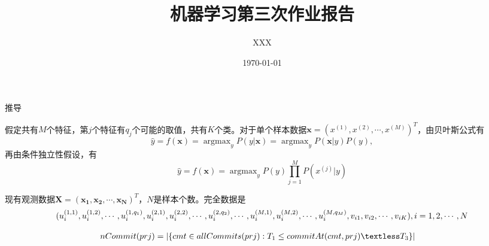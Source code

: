 \documentclass[UTF8]{ctexart}
\title{机器学习第三次作业报告}
\author{XXX}
\date{\today}
\DeclareMathOperator*{\argmax}{argmax}
\begin{document}
\maketitle

推导

假定共有$M$个特征，第$j$个特征有$q_j$个可能的取值，共有$K$个类。对于单个样本数据$\boldsymbol{x}=(x^{(1)}, x^{(2)}, \cdots, x^{(M)})^T$，由贝叶斯公式有$$
\hat{y} = f(\boldsymbol{x}) = \mathop{\argmax}_y {P(y|\boldsymbol{x})} = \mathop{\argmax}_y {P(\boldsymbol{x}|y) P(y)},
$$
再由条件独立性假设，有$$
\hat{y} = f(\boldsymbol{x}) = \mathop{\argmax}_y {P(y) \prod\limits_{j=1}^{M} P(x^{(j)}|y)}
$$

现有观测数据$\boldsymbol{X} = (\boldsymbol{x_1}, \boldsymbol{x_2}, \cdots, \boldsymbol{x_N})^T$，$N$是样本个数。完全数据是$$
(u_{i}^{(1,1)}, u_{i}^{(1,2)}, \cdots, u_{i}^{(1,q_1)}, u_{i}^{(2,1)}, u_{i}^{(2,2)}, \cdots, u_{i}^{(2,q_2)}, \cdots, u_{i}^{(M,1)}, u_{i}^{(M,2)}, \cdots, u_{i}^{(M,q_M)}, \\ v_{i1}, v_{i2}, \cdots, v_{iK}), i = 1, 2, \cdots, N
$$

\begin{align}
\label{def:nCommit}
nCommit(prj) &= \vert \{cmt \in allCommits(prj): T_1 \leq commitAt(cmt, prj) \textless T_3\} \vert
\end{align}

\end{document}

